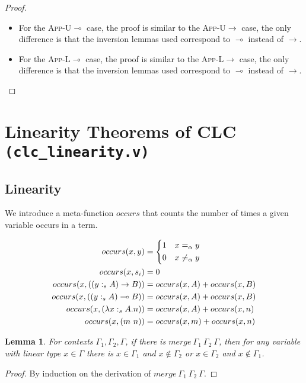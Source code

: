 \documentclass{article}
\newtheorem{lemma}[theorem]{Lemma}
\theoremstyle{definition}
\newcommand{\rname}[1]{\textsc{\footnotesize #1}}
\newcommand{\stype}[1]{:_{#1}}
\newcommand{\mrg}[3]{merge\ {#1}\ {#2}\ {#3}}
\begin{document}
\begin{proof}
\begin{itemize}
    \item For the \rname{App-U$\multimap$} case, the proof is similar to the \rname{App-U$\rightarrow$} case, the only difference is that the inversion lemmas used correspond to $\multimap$ instead of $\rightarrow$.
    \item For the \rname{App-L$\multimap$} case, the proof is similar to the \rname{App-L$\rightarrow$} case, the only difference is that the inversion lemmas used correspond to $\multimap$ instead of $\rightarrow$.
  \end{itemize}
\end{proof}

\section{Linearity Theorems of CLC \texttt{(clc_linearity.v)}}

\subsection{Linearity}

We introduce a meta-function $occurs$ that counts the number of times a given variable occurs in a term.

\begin{align*}
  occurs(x, y)                               & =
  \begin{dcases}
    1 & x =_\alpha y    \\
    0 & x \neq_\alpha y
  \end{dcases}                                                \\
  occurs(x, s_i)                             & = 0                           \\
  occurs(x, ((y \stype{s} A) \rightarrow B)) & = occurs(x, A) + occurs(x, B) \\
  occurs(x, ((y \stype{s} A) \multimap B))   & = occurs(x, A) + occurs(x, B) \\
  occurs(x, (\lambda x \stype{s} A.n))       & = occurs(x, A) + occurs(x, n) \\
  occurs(x, (m\ n))                          & = occurs(x, m) + occurs(x, n)
\end{align*}

\begin{lemma}\label{islmergeinv}
  For contexts $\Gamma_1, \Gamma_2, \Gamma$, if there is $\mrg{\Gamma_1}{\Gamma_2}{\Gamma}$, then for any variable with linear type $x \in \Gamma$ there is $x \in \Gamma_1$ and $x \notin \Gamma_2$ or $x \in \Gamma_2$ and $x \notin \Gamma_1$.
\end{lemma}
\begin{proof}
  By induction on the derivation of $\mrg{\Gamma_1}{\Gamma_2}{\Gamma}$.
\end{proof}
\end{document}
